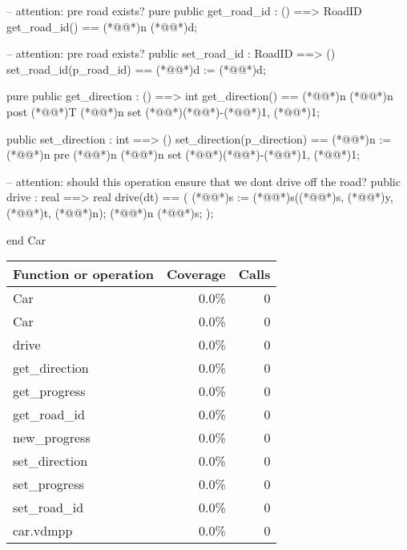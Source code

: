 \documentclass[a4paper]{article}
\begin{document}
\begin{vdm_al}
    -- attention: pre road exists?
    pure public get_road_id : () ==> RoadID
    get_road_id() == (*@@*)n (*@@*)d;

    -- attention: pre road exists?
    public set_road_id : RoadID ==> ()
    set_road_id(p_road_id) == (*@@*)d := (*@@*)d;

    pure public get_direction : () ==> int
    get_direction() == (*@@*)n (*@@*)n
    post (*@@*)T (*@@*)n set (*@\vdmnotcovered{}@*){(*@\vdmnotcovered{}@*)-(*@\vdmnotcovered{}@*)1, (*@\vdmnotcovered{}@*)1};

    public set_direction : int ==> ()
    set_direction(p_direction) == (*@@*)n := (*@@*)n
    pre (*@@*)n (*@@*)n set (*@\vdmnotcovered{}@*){(*@\vdmnotcovered{}@*)-(*@\vdmnotcovered{}@*)1, (*@\vdmnotcovered{}@*)1};

    -- attention: should this operation ensure that we dont drive off the road?
    public drive : real ==> real
    drive(dt) == (
        (*@@*)s := (*@@*)s((*@@*)s, (*@@*)y, (*@@*)t, (*@@*)n);
        (*@@*)n (*@@*)s;
    );

end Car
\end{vdm_al}
\bigskip
\begin{longtable}{|l|r|r|}
\hline
Function or operation & Coverage & Calls \\
\hline
\hline
Car & 0.0\% & 0 \\
\hline
Car & 0.0\% & 0 \\
\hline
drive & 0.0\% & 0 \\
\hline
get\_direction & 0.0\% & 0 \\
\hline
get\_progress & 0.0\% & 0 \\
\hline
get\_road\_id & 0.0\% & 0 \\
\hline
new\_progress & 0.0\% & 0 \\
\hline
set\_direction & 0.0\% & 0 \\
\hline
set\_progress & 0.0\% & 0 \\
\hline
set\_road\_id & 0.0\% & 0 \\
\hline
\hline
car.vdmpp & 0.0\% & 0 \\
\hline
\end{longtable}
\end{document}
